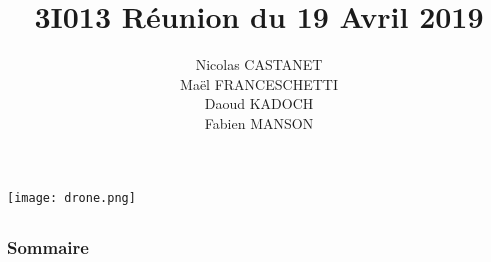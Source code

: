 \documentclass{beamer}
\title{3I013 Réunion du 19 Avril 2019}
\author{Nicolas CASTANET\\Maël FRANCESCHETTI\\Daoud KADOCH\\Fabien MANSON\\}
\begin{document}
	\begin{frame}
		\begin{center}
		\date{}
		\maketitle
		\texttt{[image: drone.png]}
		\end{center}
	\end{frame}
	
	
	\begin{frame}
		\section{}
		\begin{center}
		\frametitle{Sommaire}
		\tableofcontents{}
		\end{center}
	\end{frame}
	
	
\end{document}
